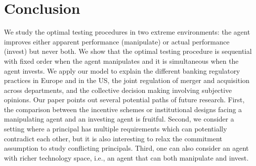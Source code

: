 \section{Conclusion}
We study the optimal testing procedures in two extreme environments: the agent improves either  apparent performance (manipulate) or actual performance (invest) but never both. We show that the optimal testing procedure is sequential with fixed order when the agent manipulates and it is simultaneous when the agent invests.
We apply our model to explain the different banking regulatory practices in Europe and in the US, the joint regulation of merger and acquisition across departments, and the collective decision making involving subjective opinions.
Our paper points out several potential paths of future research.
First, the comparison between the incentive schemes or institutional designs facing a manipulating agent and an investing agent is fruitful. 
Second, we consider a setting where a principal has multiple requirements which can potentially contradict each other, but it is also interesting to relax the commitment assumption to study conflicting principals.
Third, one can also consider an agent with richer technology space, i.e., an agent that can both manipulate and invest.